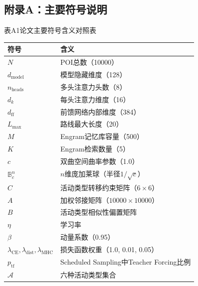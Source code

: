 \documentclass[12pt,a4paper]{ctexart}
\newenvironment{tighttable}
  {\setstretch{1.0}\small}
  {}
\begin{document}
\subsection*{附录A：主要符号说明}
{\songti\fontsize{12pt}{24pt}\selectfont
\noindent 表A1\quad 论文主要符号含义对照表

\begin{table}[H]
\centering
\begin{tighttable}
\begin{tabular}{ll}
\toprule
符号 & 含义 \\
\midrule
$N$ & POI总数（10000） \\
$d_{\text{model}}$ & 模型隐藏维度（128） \\
$n_{\text{heads}}$ & 多头注意力头数（8） \\
$d_k$ & 每头注意力维度（16） \\
$d_{\text{ff}}$ & 前馈网络内部维度（384） \\
$L_{\max}$ & 路线最大长度（20） \\
$M$ & Engram记忆库容量（500） \\
$K$ & Engram检索数量（5） \\
$c$ & 双曲空间曲率参数（1.0） \\
$\mathbb{B}^n_c$ & $n$维庞加莱球（半径$1/\sqrt{c}$） \\
$C$ & 活动类型转移约束矩阵（$6\times6$） \\
$A$ & 加权邻接矩阵（$10000\times10000$） \\
$B$ & 活动类型相似性偏置矩阵 \\
$\eta$ & 学习率 \\
$\beta$ & 动量系数（0.95） \\
$\lambda_{\text{CE}},\lambda_{\text{dist}},\lambda_{\text{MHC}}$ & 损失函数权重（1.0, 0.01, 0.05） \\
$p_{\text{tf}}$ & Scheduled Sampling中Teacher Forcing比例 \\
$\mathcal{A}$ & 六种活动类型集合 \\
\bottomrule
\end{tabular}
\end{tighttable}
\end{table}
}
\end{document}
